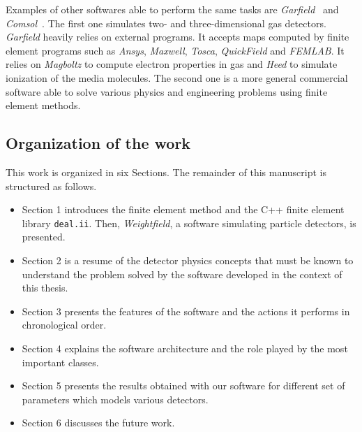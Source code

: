 \documentclass[11pt]{article}
\begin{document}
		Examples of other softwares able to perform the same tasks are
		\textit{Garfield}~\cite{garfield}	and \textit{Comsol}~\cite{comsol}.
		The first one simulates two- and three-dimensional gas detectors.
		\textit{Garfield} heavily relies on external programs.
		It accepts maps computed by finite element programs such as \textit{Ansys},
		\textit{Maxwell}, \textit{Tosca}, \textit{QuickField} and \textit{FEMLAB}.
		It relies on \textit{Magboltz} to compute electron properties in gas and
		\textit{Heed} to simulate ionization of the media molecules.
		The second one is a more general commercial software able to solve various physics and
		engineering problems using finite element methods.


	\subsection*{Organization of the work}

		This work is organized in six Sections. The remainder of this manuscript
		is structured as follows.

		\begin{itemize}
			\item Section 1 introduces the finite element method and the
			C++ finite element library \texttt{deal.ii}. Then, \textit{Weightfield},
			a software simulating particle detectors, is presented.
			\item Section 2 is a resume of the detector physics concepts that must be
			known to understand the problem solved by the software developed in the
			context of this thesis.
			\item Section 3 presents the features of the software and the actions
			it performs in chronological order.
			\item Section 4 explains the software architecture and the role played by
			the most important classes.
			\item Section 5 presents the results obtained with our software for
			different set of parameters which models various detectors.
			\item Section 6 discusses the future work.
		\end{itemize}

\end{document}
